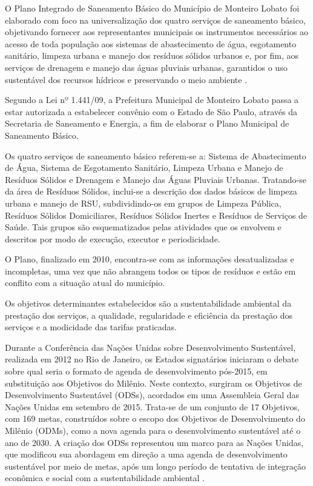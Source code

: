 	O Plano Integrado de Saneamento Básico do Município de Monteiro Lobato foi elaborado com foco na universalização dos quatro serviços de saneamento básico, objetivando fornecer aos representantes municipais os instrumentos necessários ao acesso de toda população aos sistemas de abastecimento de água, esgotamento sanitário, limpeza urbana e manejo dos resíduos sólidos urbanos e, por fim, aos serviços de drenagem e manejo das águas pluviais urbanas, garantidos o uso sustentável dos recursos hídricos e preservando o meio ambiente \cite{ml_pmisb_2007}. %
	
	Segundo a Lei nº 1.441/09, a Prefeitura Municipal de Monteiro Lobato passa a estar autorizada a estabelecer convênio com o Estado de São Paulo, através da Secretaria de Saneamento e Energia, a fim de elaborar o Plano Municipal de Saneamento Básico.
	
	Os quatro serviços de saneamento básico referem-se a: Sistema de Abastecimento de Água, Sistema de Esgotamento Sanitário, Limpeza Urbana e Manejo de Resíduos Sólidos e Drenagem e Manejo das Águas Pluviais Urbanas. Tratando-se da área de Resíduos Sólidos, inclui-se a descrição dos dados básicos de limpeza urbana e manejo de RSU, subdividindo-os em grupos de Limpeza Pública, Resíduos Sólidos Domiciliares, Resíduos Sólidos Inertes e Resíduos de Serviços de Saúde. Tais grupos são esquematizados pelas atividades que os envolvem e descritos por modo de execução, executor e periodicidade.
	
	O Plano, finalizado em 2010, encontra-se com as informações desatualizadas e incompletas, uma vez que não abrangem todos os tipos de resíduos e estão em conflito com a situação atual do município.
	
	Os objetivos determinantes estabelecidos são a sustentabilidade ambiental da prestação dos serviços, a qualidade, regularidade e eficiência da prestação dos serviços e a modicidade das tarifas praticadas.
	
	Durante a Conferência das Nações Unidas sobre Desenvolvimento Sustentável, realizada em 2012 no Rio de Janeiro, os Estados signatários iniciaram o debate sobre qual seria o formato de agenda de desenvolvimento pós-2015, em substituição aos Objetivos do Milênio. Neste contexto, surgiram os Objetivos de Desenvolvimento Sustentável (ODSs), acordados em uma Assembleia Geral das Nações Unidas em setembro de 2015. Trata-se de um conjunto de 17 Objetivos, com 169 metas, construídos sobre o escopo dos Objetivos de Desenvolvimento do Milênio (ODMs), como a nova agenda para o desenvolvimento sustentável até o ano de 2030. A criação dos ODSs representou um marco para as Nações Unidas, que modificou sua abordagem em direção a uma agenda de desenvolvimento sustentável por meio de metas, após um longo período de tentativa de integração econômica e social com a sustentabilidade ambiental \cite{biermann_global_2017}.
	
